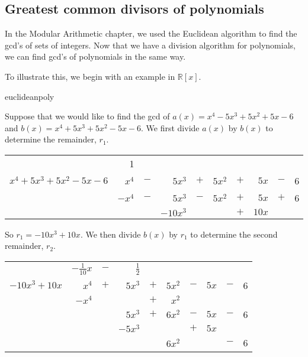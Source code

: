 \subsection{Greatest common divisors of polynomials}
In the Modular Arithmetic chapter, we used the Euclidean algorithm to find the gcd's of sets of integers. Now that we have a division algorithm for polynomials, we can find gcd's of polynomials in the same way. 

To illustrate this, we begin with an example in $\mathbb{R}[x]$.

\begin{example}{euclideanpoly} 

Suppose that we would like to find the gcd of $a(x) = x^4 - 5x^3 + 5x^2 +5x - 6$ and $b(x) = x^4 + 5x^3 + 5x^2 - 5x -6$.  We first divide $a(x)$ by $b(x)$ to determine the remainder, $r_1$.

\begin{center}
\begin{tabular}{rrcrcrcrcr}
        &  1         &        &                 &           &             &         &         &        &   \\ \cline{2-10}
 \multicolumn{1}{r|}{$x^4 + 5x^3 + 5x^2 - 5x -6$}
        &  $x^4$  &  $-$  &    $5x^3$   &  $+$   & $5x^2$  &  $+$  &  $5x$ & $-$  & 6 \\
        &  $-x^4$ &  $-$  &  $5x^3$     &   $-$   & $5x^2$  &  $+$  &  $5x$ & $+$ & 6 \\ \cline{2-10}
        &             &        &  $-10x^3$  &          &              &  $+$  & $10x$&       &    \\
 \end{tabular}
\end{center}

So $r_1 =-10x^3+10x$. We then divide $b(x)$ by $r_1$ to determine the second remainder, $r_2$.

\begin{center}
\begin{tabular}{rrcrcrcrcr}
        &  $-\frac{1}{10}x$        &    $-$    &     $\frac{1}{2}$            &           &             &         &         &        &   \\ \cline{2-10}
 \multicolumn{1}{r|}{$-10x^3+10x$}
        &  $x^4$  &  $+$  &    $5x^3$   &  $+$   & $5x^2$  &  $-$  &  $5x$ & $-$   & 6 \\
        &  $-x^4$ &          &                    &  $+$   & $x^2$    &         &           &         &  \\ \cline{2-10}
        &               &         &  $5x^3$      &  $+$   & $6x^2$  &  $-$  & $5x$  &  $-$  &  6  \\
        &              &          &  $-5x^3$    &            &                &  $+$ &  $5x$ &         &  \\ \cline{4-10}
        &              &          &                    &            & $6x^2$  &          &           & $-$  & 6\\
 \end{tabular}
\end{center}


\end{example}
